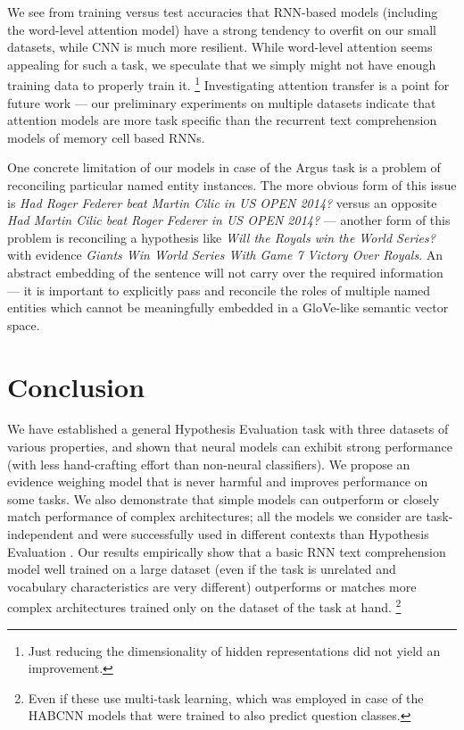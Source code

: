 \documentclass[11pt]{article}
\begin{document}
We see from training versus test accuracies that RNN-based
models (including the word-level attention model) have a strong tendency
to overfit on our small datasets, while CNN is much more resilient.
While word-level attention seems appealing for such a task,
we speculate that we simply might not have enough training data to
properly train it.%
\footnote{Just reducing the dimensionality of hidden representations did not yield an improvement.}
Investigating attention transfer is a point for future work --- our
preliminary experiments on multiple datasets indicate that attention
models are more task specific than the recurrent text comprehension models
of memory cell based RNNs.



One concrete limitation of our models in case of the Argus task
is a problem of reconciling particular named entity instances.
The more obvious form of this issue is \textit{Had Roger Federer beat Martin Cilic in US OPEN 2014?}
versus an opposite \textit{Had Martin Cilic beat Roger Federer in US OPEN 2014?} ---
another form of this problem is reconciling a hypothesis like
\textit{Will the Royals win the World Series?}
with evidence
\textit{Giants Win World Series With Game 7 Victory Over Royals}.
An abstract embedding of the sentence will not carry over the required
information --- it is important to explicitly pass and reconcile the roles
of multiple named entities which cannot be meaningfully embedded in a GloVe-like
semantic vector space.


\section{Conclusion}
\label{sec:concl}

We have established a general Hypothesis Evaluation task with three datasets
of various properties, and shown that neural models can exhibit strong
performance (with less hand-crafting effort than non-neural classifiers).
We propose an evidence weighing model that is never harmful and improves
performance on some tasks.
We also demonstrate that simple models can outperform or closely match
performance of complex architectures;
all the models we consider are task-independent and were successfully
used in different contexts than Hypothesis Evaluation \cite{sps}.
Our results empirically show that a basic RNN text comprehension model
well trained on a large dataset (even if the task is unrelated and vocabulary
characteristics are very different) outperforms or matches more complex
architectures trained only on the dataset of the task at hand.%
\footnote{Even if these use multi-task learning, which was employed in case
of the HABCNN models that were trained to also predict question classes.}
\end{document}
